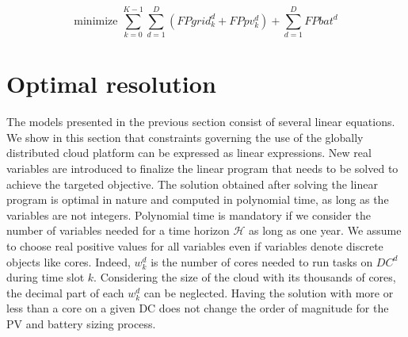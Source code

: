 \begin{equation} \label{eq:FPALL}
\text{minimize }\sum_{k=0}^{K-1} \sum_{d=1}^D ( FPgrid^d_k +  FPpv^d_k) + \sum_{d=1}^D FPbat^d
\end{equation}

%
\section{Optimal resolution}
\label{sec:optimalresolution_ccgrid}



The models presented in the previous section consist of several linear equations. We show in this section that constraints governing the use of the globally distributed cloud platform can be expressed as linear expressions. New real variables are introduced to finalize the linear program that needs to be solved to achieve the targeted objective. The solution obtained after solving the linear program is optimal in nature and computed in polynomial time, as long as the variables are not integers. Polynomial time is mandatory if we consider the number of variables needed for a time horizon $\mathcal{H}$ as long as one year. We assume to choose real positive values for all variables even if variables denote discrete objects like cores. Indeed, $w_k^d$ is the number of cores needed to run tasks on $DC^d$ during time slot $k$. Considering the size of the cloud with its thousands of cores, the decimal part of each $w_k^d$ can be neglected. Having the solution with more or less than a core on a given DC does not change the order of magnitude for the PV and battery sizing process.

